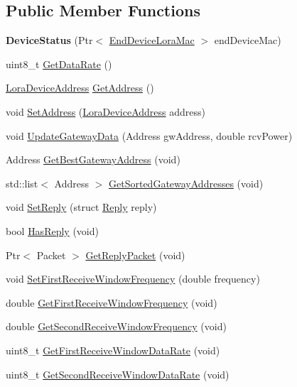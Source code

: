 \subsection*{Public Member Functions}
\begin{DoxyCompactItemize}
\item 
\mbox{\label{classns3_1_1lorawan_1_1DeviceStatus_ac00447539b1da7b1c4aeb7479b5d48ff}} 
{\bfseries Device\+Status} (Ptr$<$ \hyperlink{classns3_1_1lorawan_1_1EndDeviceLoraMac}{End\+Device\+Lora\+Mac} $>$ end\+Device\+Mac)
\item 
uint8\+\_\+t \hyperlink{classns3_1_1lorawan_1_1DeviceStatus_af0d05320ecdc282c13597c101076c605}{Get\+Data\+Rate} ()
\item 
\hyperlink{classns3_1_1lorawan_1_1LoraDeviceAddress}{Lora\+Device\+Address} \hyperlink{classns3_1_1lorawan_1_1DeviceStatus_ad1ff55d93bc1347ac860a921d590053e}{Get\+Address} ()
\item 
void \hyperlink{classns3_1_1lorawan_1_1DeviceStatus_a690f9059f8cc8b6ce516da4d670f4b94}{Set\+Address} (\hyperlink{classns3_1_1lorawan_1_1LoraDeviceAddress}{Lora\+Device\+Address} address)
\item 
void \hyperlink{classns3_1_1lorawan_1_1DeviceStatus_a76581259b5b053500387dc3e9b73094b}{Update\+Gateway\+Data} (Address gw\+Address, double rcv\+Power)
\item 
Address \hyperlink{classns3_1_1lorawan_1_1DeviceStatus_a339650bdf62a9c13d458f4276222e740}{Get\+Best\+Gateway\+Address} (void)
\item 
std\+::list$<$ Address $>$ \hyperlink{classns3_1_1lorawan_1_1DeviceStatus_a6174dfca1f330b02f833683117acecdb}{Get\+Sorted\+Gateway\+Addresses} (void)
\item 
void \hyperlink{classns3_1_1lorawan_1_1DeviceStatus_a10001b2464375197ac57462323ef2766}{Set\+Reply} (struct \hyperlink{structns3_1_1lorawan_1_1DeviceStatus_1_1Reply}{Reply} reply)
\item 
bool \hyperlink{classns3_1_1lorawan_1_1DeviceStatus_a1a713e0523cef431cd3194aa27bd6f57}{Has\+Reply} (void)
\item 
Ptr$<$ Packet $>$ \hyperlink{classns3_1_1lorawan_1_1DeviceStatus_ad83a579eab32d419aeb0409d959a8ff0}{Get\+Reply\+Packet} (void)
\item 
void \hyperlink{classns3_1_1lorawan_1_1DeviceStatus_a27f4dfe68d8361e4835c50865aaf7325}{Set\+First\+Receive\+Window\+Frequency} (double frequency)
\item 
double \hyperlink{classns3_1_1lorawan_1_1DeviceStatus_ab83d8a40859427f84e56f6536d1337de}{Get\+First\+Receive\+Window\+Frequency} (void)
\item 
double \hyperlink{classns3_1_1lorawan_1_1DeviceStatus_a3b908979aaebd791d3c54196fcf938f1}{Get\+Second\+Receive\+Window\+Frequency} (void)
\item 
uint8\+\_\+t \hyperlink{classns3_1_1lorawan_1_1DeviceStatus_a4645606cdd1fd2f4c94d1f8ec919f49f}{Get\+First\+Receive\+Window\+Data\+Rate} (void)
\item 
uint8\+\_\+t \hyperlink{classns3_1_1lorawan_1_1DeviceStatus_a65e9a5079d08a3e85db3c9ecc5c2177c}{Get\+Second\+Receive\+Window\+Data\+Rate} (void)
\end{DoxyCompactItemize}


